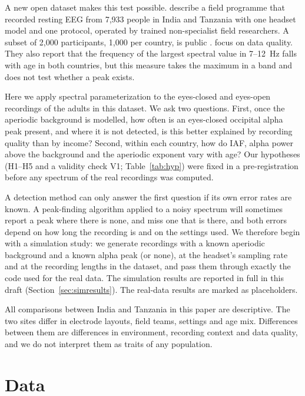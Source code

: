 \documentclass[11pt,a4paper]{article}
\begin{document}
A new open dataset makes this test possible. \citet{vianney2025} describe a field
programme that recorded resting EEG from 7,933 people in India and Tanzania with one
headset model and one protocol, operated by trained non-specialist field researchers. A
subset of 2,000 participants, 1,000 per country, is public \citep{openneuro_ds007358}.
\citet{vianney2025} focus on data quality. They also report that the frequency of the
largest spectral value in 7--12~Hz falls with age in both countries, but this measure
takes the maximum in a band and does not test whether a peak exists.

Here we apply spectral parameterization \citep[specparam;][]{donoghue2020} to the
eyes-closed and eyes-open recordings of the adults in this dataset. We ask two questions.
First, once the aperiodic background is modelled, how often is an eyes-closed occipital
alpha peak present, and where it is not detected, is this better explained by recording
quality than by income? Second, within each country, how do IAF, alpha power above the
background and the aperiodic exponent vary with age? Our hypotheses (H1--H5 and a validity
check V1; Table~\ref{tab:hyp}) were fixed in a pre-registration before any spectrum of the
real recordings was computed.

A detection method can only answer the first question if its own error rates are known. A
peak-finding algorithm applied to a noisy spectrum will sometimes report a peak where
there is none, and miss one that is there, and both errors depend on how long the
recording is and on the settings used. We therefore begin with a simulation study: we
generate recordings with a known aperiodic background and a known alpha peak (or none), at
the headset's sampling rate and at the recording lengths in the dataset, and pass them
through exactly the code used for the real data. The simulation results are reported in
full in this draft (Section~\ref{sec:simresults}). The real-data results are marked as
placeholders.

All comparisons between India and Tanzania in this paper are descriptive. The two sites
differ in electrode layouts, field teams, settings and age mix. Differences between them
are differences in environment, recording context and data quality, and we do not
interpret them as traits of any population.

\section{Data}
\end{document}
